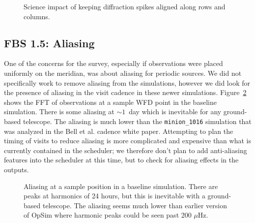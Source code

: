 \begin{figure}
\caption{Science impact of keeping diffraction spikes aligned along rows and columns. }
\label{fig:spider_radar}
\end{figure}


\subsection{FBS 1.5: Aliasing}

One of the concerns for the survey, especially if observations were placed uniformly on the meridian, was about aliasing for periodic sources. We did not specifically work to remove aliasing from the simulations, however we did look for the presence of aliasing in the visit cadence in these newer simulations.  Figure~\ref{fig:alias} shows the FFT of observations at a sample WFD point in the baseline simulation. There is some aliasing at $\sim1$\ day which is inevitable for any ground-based telescope.  The aliasing is much lower than the {\tt minion\_1016} simulation that was analyzed in the Bell et al. cadence white paper. Attempting to plan the timing of visits to reduce aliasing is more complicated and expensive than what is currently contained in the scheduler; we therefore don't plan to add anti-aliasing features into the scheduler at this time, but to check for aliasing effects in the outputs.

\begin{figure}
\label{fig:alias}
\caption{Aliasing at a sample position in a baseline simulation. There are peaks at harmonics of 24 hours, but this is inevitable with a ground-based telescope. The aliasing seems much lower than earlier version of OpSim where harmonic peaks could be seen past 200 $\mu$Hz.}
\end{figure}



